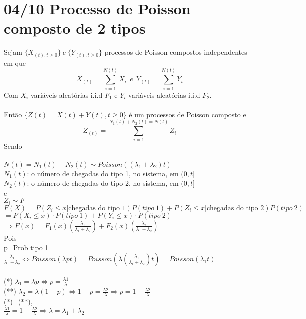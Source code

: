 \documentclass[a4paper,12pt]{article}
\begin{document}
           \section*{04/10 Processo de Poisson composto de 2 tipos}
           Sejam $\{X_{(t),t\ge0}\} \ e \ \{Y_{(t),t\ge0}\}$ processos de Poisson compostos independentes em que
           $$ X_{(t)}=\sum\limits_{i=1}^{N(t)}X_i \ \ e \ \ Y_{(t)}=\sum\limits_{i=1}^{N(t)}Y_i$$
           Com $X_i$ variáveis aleatórias i.i.d $F_1$ e $Y_i$ variáveis aleatórias i.i.d $F_2$.\\
           \\
           Então $\{Z(t)=X(t)+Y(t),t\ge0\}$ é um processos de Poisson composto e 
           $$Z_{(t)}=\sum\limits_{i=1}^{N_1(t)+N_2(t)=N(t)}Z_i  $$
           Sendo \\
           \\
           $N(t)=N_1(t)+N_2(t)\sim Poisson\left((\lambda_1+\lambda_2)t\right)$\\
           $N_1(t)$: o número de chegadas do tipo 1, no sistema, em $(0,t]$\\
                      $N_2(t)$: o número de chegadas do tipo 2, no sistema, em $(0,t]$\\
                      e\\
                      $Z_i\sim F$\\
           $F(X)=P(Z_i\le x|\text{chegadas do tipo 1})P(tipo \ 1 )+P(Z_i\le x|\text{chegadas do tipo 2})P(tipo \ 2 )$\\
           $=P(X_i\le x)\cdot P(tipo\ 1)+P(Y_i\le x)\cdot P(tipo\ 2)$\\
           $\Rightarrow F(x)=F_1(x)\left(\frac{\lambda_1}{\lambda_1+\lambda_2}\right)+F_2(x)\left(\frac{\lambda_2}{\lambda_1+\lambda_2}\right)$\\
           Pois\\
           p=Prob tipo 1 = $\frac{\lambda_1}{\lambda_1+\lambda_2} \Leftrightarrow Poisson(\lambda p t )=Poisson\left(\lambda\left(\frac{\lambda_1}{\lambda_1+\lambda_2}\right)t \right)=Poisson(\lambda_1 t)$\\
           \\   
          (*) $\lambda_1=\lambda p \Leftrightarrow p=\frac{\lambda1}{\lambda}$\\
                     (**) $\lambda_2=\lambda(1-p) \Leftrightarrow1-p=\frac{\lambda2}{\lambda}\Rightarrow p=1-\frac{\lambda2}{\lambda} $\\
                     (*)=(**),\\
                     $\frac{\lambda1}{\lambda}=1-\frac{\lambda2}{\lambda} \Rightarrow \lambda=\lambda_1+\lambda_2$
           \newpage
\end{document}
